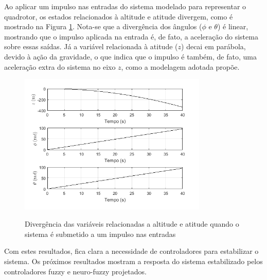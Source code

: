 Ao aplicar um impulso nas entradas do sistema modelado para representar o quadrotor, os estados relacionados à altitude e atitude divergem, como é mostrado na Figura \ref{fig:uncontrolled}. Nota-se que a divergência dos ângulos ($\phi$ e $\theta$) é linear, mostrando que o impulso aplicada na entrada é, de fato, a aceleração do sistema sobre essas saídas. Já a variável relacionada à atitude ($z$) decai em parábola, devido à ação da gravidade, o que indica que o impulso é também, de fato, uma aceleração extra do sistema no eixo $z$, como a modelagem adotada propõe.

\begin{figure}[!htb]
    \centering
    \caption{Divergência das variáveis relacionadas a altitude e atitude quando o sistema é submetido a um impulso nas entradas}
    \includegraphics[width=0.8\textwidth]{./04-figuras/resultados/novos/uncontrolled}
    \label{fig:uncontrolled}
\end{figure}

Com estes resultados, fica clara a necessidade de controladores para estabilizar o sistema. Os próximos resultados mostram a resposta do sistema estabilizado pelos controladores fuzzy e neuro-fuzzy projetados.